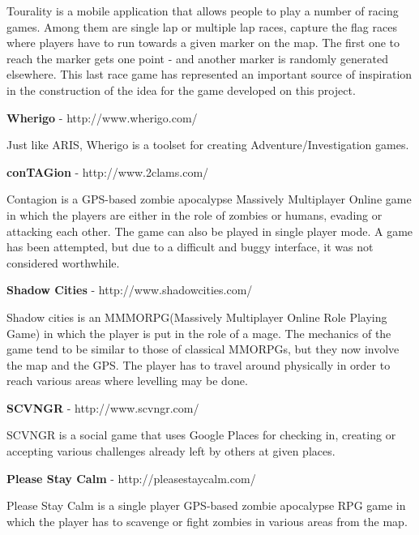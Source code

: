 \documentclass{article}
\begin{document}
Tourality is a mobile application that allows people to play a number of racing
games. Among them are single lap or multiple lap races, capture the flag races
where players have to run towards a given marker on the map. The first one to
reach the marker gets one point - and another marker is randomly generated
elsewhere. This last race game has represented an important source of
inspiration in the construction of the idea for the game developed on this
project.\newline

\textbf{Wherigo} - http://www.wherigo.com/\newline

Just like ARIS, Wherigo is a toolset for creating Adventure/Investigation games.
\newline

\textbf{conTAGion} - http://www.2clams.com/\newline

Contagion is a GPS-based zombie apocalypse Massively Multiplayer Online game in
which the players are either in the role of zombies or humans, evading or
attacking each other. The game can also be played in single player mode. A game
has been attempted, but due to a difficult and buggy interface, it was
not considered worthwhile.\newline

\textbf{Shadow Cities} - http://www.shadowcities.com/\newline
 
Shadow cities is an MMMORPG(Massively Multiplayer Online Role Playing Game) in
which the player is put in the role of a mage. The mechanics of the game tend to
be similar to those of classical MMORPGs, but they now involve the map and the
GPS. The player has to travel around physically in order to reach various areas
where levelling may be done.\newline

\textbf{SCVNGR} - http://www.scvngr.com/\newline

SCVNGR is a social game that uses Google Places for checking in, creating or
accepting various challenges already left by others at given places.\newline

\textbf{Please Stay Calm} - http://pleasestaycalm.com/ \newline

Please Stay Calm is a single player GPS-based zombie apocalypse RPG game in
which the player has to scavenge or fight zombies in various areas from the
map.\newline
\end{document}
